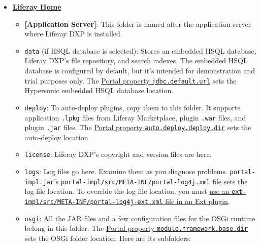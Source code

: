 \begin{itemize}
\tightlist
\item
  \textbf{\hyperref[liferay-home]{Liferay Home}}

  \begin{itemize}
  \item
    \textbf{{[}Application Server{]}}: This folder is named after the
    application server where Liferay DXP is installed.
  \item
    \texttt{data} (if HSQL database is selected): Stores an embedded
    HSQL database, Liferay DXP's file repository, and search indexes.
    The embedded HSQL database is configured by default, but it's
    intended for demonstration and trial purposes only. The
    \href{@platform-ref@/7.2-latest/propertiesdoc/portal.properties.html\#JDBC}{Portal
    property \texttt{jdbc.default.url}} sets the Hypersonic embedded
    HSQL database location.
  \item
    \texttt{deploy}: To auto-deploy plugins, copy them to this folder.
    It supports application \texttt{.lpkg} files from Liferay
    Marketplace, plugin \texttt{.war} files, and plugin \texttt{.jar}
    files. The
    \href{@platform-ref@/7.2-latest/propertiesdoc/portal.properties.html\#Auto\%20Deploy}{Portal
    property \texttt{auto.deploy.deploy.dir}} sets the auto-deploy
    location.
  \item
    \texttt{license}: Liferay DXP's copyright and version files are
    here.
  \item
    \texttt{logs}: Log files go here. Examine them as you diagnose
    problems. \texttt{portal-impl.jar}'s
    \texttt{portal-impl/src/META-INF/portal-log4j.xml} file sets the log
    file location. To override the log file location, you must
    \href{/docs/7-0/tutorials/-/knowledge_base/t/advanced-customization-with-ext-plugins\#using-advanced-configuration-files}{use
    an \texttt{ext-impl/src/META-INF/portal-log4j-ext.xml} file in an
    Ext plugin}.
  \item
    \texttt{osgi}: All the JAR files and a few configuration files for
    the OSGi runtime belong in this folder. The
    \href{@platform-ref@/7.2-latest/propertiesdoc/portal.properties.html\#Module\%20Framework}{Portal
    property \texttt{module.framework.base.dir}} sets the OSGi folder
    location. Here are its subfolders:


\end{itemize}
\end{itemize}
